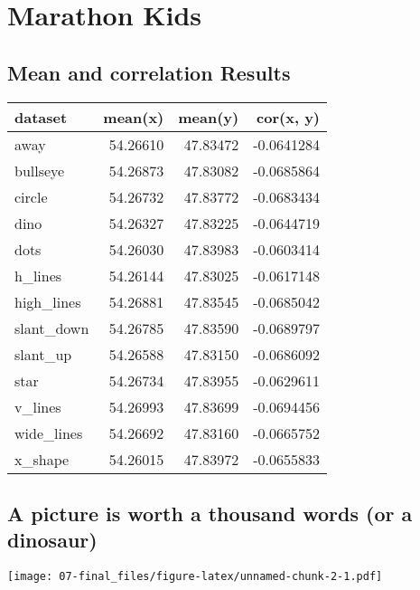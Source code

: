 \documentclass[
]{book}
\begin{document}
\hypertarget{marathon-kids-1}{%
\section{Marathon Kids}\label{marathon-kids-1}}

\hypertarget{mean-and-correlation-results}{%
\subsection{Mean and correlation Results}\label{mean-and-correlation-results}}

\begin{tabular}{l|r|r|r}
\hline
dataset & mean(x) & mean(y) & cor(x, y)\\
\hline
away & 54.26610 & 47.83472 & -0.0641284\\
\hline
bullseye & 54.26873 & 47.83082 & -0.0685864\\
\hline
circle & 54.26732 & 47.83772 & -0.0683434\\
\hline
dino & 54.26327 & 47.83225 & -0.0644719\\
\hline
dots & 54.26030 & 47.83983 & -0.0603414\\
\hline
h\_lines & 54.26144 & 47.83025 & -0.0617148\\
\hline
high\_lines & 54.26881 & 47.83545 & -0.0685042\\
\hline
slant\_down & 54.26785 & 47.83590 & -0.0689797\\
\hline
slant\_up & 54.26588 & 47.83150 & -0.0686092\\
\hline
star & 54.26734 & 47.83955 & -0.0629611\\
\hline
v\_lines & 54.26993 & 47.83699 & -0.0694456\\
\hline
wide\_lines & 54.26692 & 47.83160 & -0.0665752\\
\hline
x\_shape & 54.26015 & 47.83972 & -0.0655833\\
\hline
\end{tabular}

\hypertarget{a-picture-is-worth-a-thousand-words-or-a-dinosaur}{%
\subsection{\texorpdfstring{A picture is worth a thousand words (\textbf{or a dinosaur})}{A picture is worth a thousand words (or a dinosaur)}}\label{a-picture-is-worth-a-thousand-words-or-a-dinosaur}}

\texttt{[image: 07-final\_files/figure-latex/unnamed-chunk-2-1.pdf]}
\end{document}
